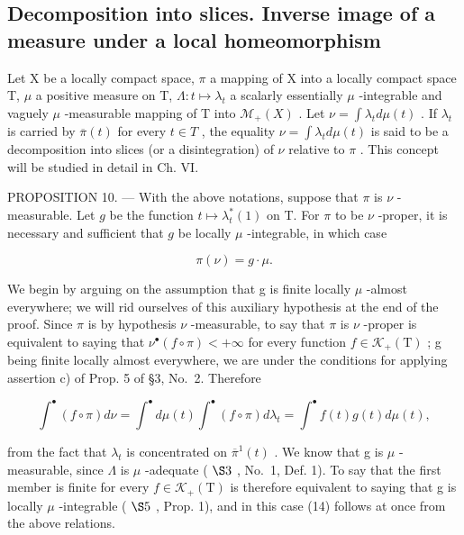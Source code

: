 \subsection{Decomposition into slices. Inverse image of a measure under a local homeomorphism}

Let X be a locally compact space, \(\pi\) a mapping of X into a locally compact space T, \(\mu\) a positive measure on T, \(\Lambda: t \mapsto \lambda_t\) a scalarly essentially \(\mu\) -integrable and vaguely \(\mu\) -measurable mapping of T into \(\mathcal{M}_{+}(X)\) . Let \(\nu = \int \lambda_t d\mu(t)\) . If \(\lambda_t\) is carried by \(\overline{\pi}(t)\) for every \(t \in T\) , the equality \(\nu = \int \lambda_t d\mu(t)\) is said to be a decomposition into slices (or a disintegration) of \(\nu\) relative to \(\pi\) . This concept will be studied in detail in Ch. VI.

PROPOSITION 10. --- With the above notations, suppose that \(\pi\) is \(\nu\) -measurable. Let \(g\) be the function \(t \mapsto \lambda_t^*(1)\) on T. For \(\pi\) to be \(\nu\) -proper, it is necessary and sufficient that \(g\) be locally \(\mu\) -integrable, in which case

\[
\pi (\nu) = g \cdot \mu .\tag{14}
\]

We begin by arguing on the assumption that g is finite locally \(\mu\) -almost everywhere; we will rid ourselves of this auxiliary hypothesis at the end of the proof. Since \(\pi\) is by hypothesis \(\nu\) -measurable, to say that \(\pi\) is \(\nu\) -proper is equivalent to saying that \(\nu^{\bullet}(f\circ\pi)<+\infty\) for every function \(f\in\mathcal{K}_{+}(\mathrm{T})\) ; g being finite locally almost everywhere, we are under the conditions for applying assertion c) of Prop. 5 of §3, No.~2. Therefore

\[
\int^ {\bullet} (f \circ \pi) d \nu = \int^ {\bullet} d \mu (t) \int^ {\bullet} (f \circ \pi) d \lambda_ {t} = \int^ {\bullet} f (t) g (t) d \mu (t),
\]

from the fact that \(\lambda_{t}\) is concentrated on \(\overline{\pi}^{1}(t)\) . We know that g is \(\mu\) -measurable, since \(\Lambda\) is \(\mu\) -adequate ( \(\S3\) , No.~1, Def. 1). To say that the first member is finite for every \(f \in \mathcal{K}_{+}(\mathrm{T})\) is therefore equivalent to saying that g is locally \(\mu\) -integrable ( \(\S5\) , Prop. 1), and in this case (14) follows at once from the above relations.

